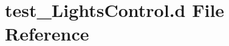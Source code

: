 \hypertarget{test___lights_control_8d}{}\section{test\+\_\+\+Lights\+Control.\+d File Reference}
\label{test___lights_control_8d}
